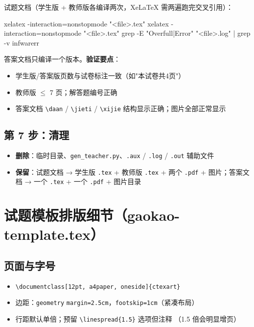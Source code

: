 \documentclass[11pt,a4paper]{ctexart}
\begin{document}
试题文档（学生版 + 教师版各编译两次，XeLaTeX 需两遍跑完交叉引用）：

\begin{codeblock}
xelatex -interaction=nonstopmode "<file>.tex"
xelatex -interaction=nonstopmode "<file>.tex"
grep -E "Overfull|Error" "<file>.log" | grep -v infwarerr
\end{codeblock}

答案文档只编译一个版本。\textbf{验证要点}：

\begin{itemize}
  \item 学生版/答案版页数与试卷标注一致（如"本试卷共4页"）
  \item 教师版 $\leq$ 7 页；解答题编号正确
  \item 答案文档 \texttt{\textbackslash daan} / \texttt{\textbackslash jieti} /
        \texttt{\textbackslash xijie} 结构显示正确；图片全部正常显示
\end{itemize}

\subsection{第 7 步：清理}

\begin{itemize}
  \item \textbf{删除}：临时目录、\texttt{gen\_teacher.py}、\texttt{.aux} / \texttt{.log} /
        \texttt{.out} 辅助文件
  \item \textbf{保留}：试题文档 → 学生版 \texttt{.tex} + 教师版 \texttt{.tex} + 两个
        \texttt{.pdf} + 图片；答案文档 → 一个 \texttt{.tex} + 一个 \texttt{.pdf} + 图片目录
\end{itemize}

\section{试题模板排版细节（gaokao-template.tex）}

\subsection{页面与字号}

\begin{itemize}
  \item \texttt{\textbackslash documentclass[12pt, a4paper, oneside]\{ctexart\}}
  \item 边距：\texttt{geometry} \texttt{margin=2.5cm}，\texttt{footskip=1cm}（紧凑布局）
  \item 行距默认单倍；预留 \texttt{\textbackslash linespread\{1.5\}} 选项但注释
        （1.5 倍会明显增页）
\end{itemize}
\end{document}
